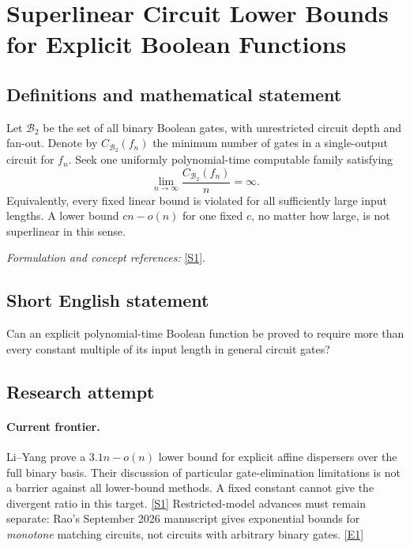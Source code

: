 \documentclass[11pt,a4paper]{article}
\newcommand{\sref}[2]{\hyperlink{source:#1:#2}{[S#2]}}
\newcommand{\eref}[2]{\hyperlink{extra:#1:#2}{[E#2]}}
\newif\ifshowcatalogue
\newcommand{\cataloguescope}[1]{\ifshowcatalogue
 \paragraph{Exact scope in the supplied catalogue.}
 \begin{quote}\small #1\end{quote}\fi}
\numberwithin{equation}{section}
\begin{document}
\setcounter{section}{0}
\clearpage
\section*{\texorpdfstring{Superlinear Circuit Lower Bounds for Explicit Boolean Functions}{Superlinear Circuit Lower Bounds for Explicit Boolean Functions}}\label{30006747}
\subsection{Definitions and mathematical statement}
Let $\mathcal B_2$ be the set of all binary Boolean gates, with unrestricted circuit depth and fan-out. Denote by $C_{\mathcal B_2}(f_n)$ the minimum number of gates in a single-output circuit for $f_n$. Seek one uniformly polynomial-time computable family satisfying
\[
 \lim_{n\to\infty}\frac{C_{\mathcal B_2}(f_n)}{n}=\infty.
\]
Equivalently, every fixed linear bound is violated for all sufficiently large input lengths. A lower bound $cn-o(n)$ for one fixed $c$, no matter how large, is not superlinear in this sense.
\par\smallskip\textit{Formulation and concept references:} \sref{30006747}{1}.
\cataloguescope{There exists a Boolean function family f\_n:\{0,1\}\textasciicircum{}n->\{0,1\}, n>=1, evaluated by a single deterministic polynomial-time algorithm on (1\textasciicircum{}n,x), whose minimum gate count C\_B2(f\_n) over single-output fan-in-two circuits using arbitrary binary Boolean gates satisfies C\_B2(f\_n)=omega(n): for every c>0 there is N such that C\_B2(f\_n)>c*n for every n>=N. The circuits have unrestricted depth and fan-out; no fixed linear constant counts as superlinear.}
\subsection{Short English statement}
Can an explicit polynomial-time Boolean function be proved to require more than every constant multiple of its input length in general circuit gates?
\subsection{Research attempt}

\paragraph{Current frontier.}
Li--Yang prove a $3.1n-o(n)$ lower bound for explicit affine dispersers over
the full binary basis. Their discussion of particular gate-elimination
limitations is not a barrier against all lower-bound methods. A fixed
constant cannot give the divergent ratio in this target. \sref{30006747}{1}
Restricted-model advances must remain separate: Rao's September 2026
manuscript gives exponential bounds for \emph{monotone} matching circuits,
not circuits with arbitrary binary gates. \eref{30006747}{1}
\end{document}
